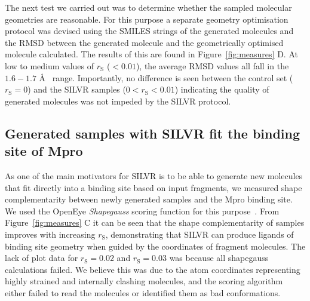 \documentclass[journal=jacsat,manuscript=article]{achemso}
\begin{document}
The next test we carried out was to determine whether the sampled molecular geometries are reasonable. For this purpose a separate geometry optimisation protocol was devised using the SMILES strings of the generated molecules and the RMSD between the generated molecule and the geometrically optimised molecule calculated. The results of this are found in Figure~\ref{fig:measures} D. At low to medium values of $r_{\mathrm{S}}$ ($< 0.01$), the average RMSD values all fall in the $1.6 - 1.7$ \AA~  range. Importantly, no difference is seen between the control set ($r_{\mathrm{S}}=0$) and the SILVR samples ($0 < r_{\mathrm{S}} < 0.01$) indicating the quality of generated molecules was not impeded by the SILVR protocol. 

\subsection{Generated samples with SILVR fit the binding site of Mpro}
As one of the main motivators for SILVR is to be able to generate new molecules that fit directly into a binding site based on input fragments, we measured shape complementarity between newly generated samples and the Mpro binding site. We used the OpenEye \textit{Shapegauss} scoring function for this purpose~\cite{kelley2015posit}. From Figure~\ref{fig:measures} C it can be seen that the shape complementarity of samples improves with increasing $r_{\mathrm{S}}$, demonstrating that SILVR can produce ligands of binding site geometry when guided by the coordinates of fragment molecules. The lack of plot data for $r_{\mathrm{S}}=0.02$ and $r_{\mathrm{S}}=0.03$ was because all shapegauss calculations failed. We believe this was due to the atom coordinates representing highly strained and internally clashing molecules, and the scoring algorithm either failed to read the molecules or identified them as bad conformations.
\end{document}
